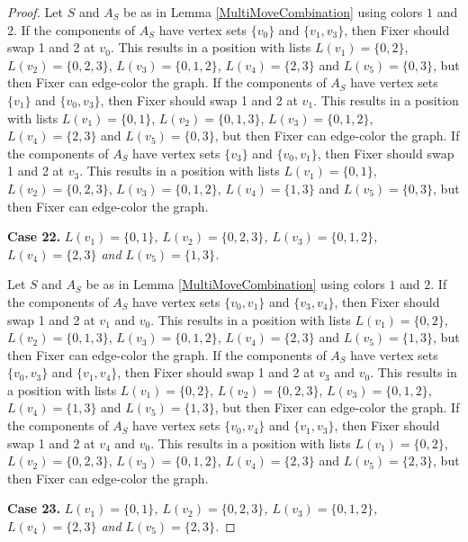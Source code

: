 \documentclass[12pt]{amsart}
\theoremstyle{plain}
\theoremstyle{definition}
\theoremstyle{remark}
\begin{document}
\begin{proof}
Let $S$ and $A_S$ be as in Lemma \ref{MultiMoveCombination} using colors $1$ and $2$. If the components of $A_S$ have vertex sets $\{v_0\}$ and $\{v_1, v_3\}$, then Fixer should swap 1 and 2 at $v_0$. This results in a position with lists $L(v_1) = \{0, 2\}$, $L(v_2) = \{0, 2, 3\}$, $L(v_3) = \{0, 1, 2\}$, $L(v_4) = \{2, 3\}$ and $L(v_5) = \{0, 3\}$, but then Fixer can edge-color the graph.
If the components of $A_S$ have vertex sets $\{v_1\}$ and $\{v_0, v_3\}$, then Fixer should swap 1 and 2 at $v_1$. This results in a position with lists $L(v_1) = \{0, 1\}$, $L(v_2) = \{0, 1, 3\}$, $L(v_3) = \{0, 1, 2\}$, $L(v_4) = \{2, 3\}$ and $L(v_5) = \{0, 3\}$, but then Fixer can edge-color the graph.
If the components of $A_S$ have vertex sets $\{v_3\}$ and $\{v_0, v_1\}$, then Fixer should swap 1 and 2 at $v_3$. This results in a position with lists $L(v_1) = \{0, 1\}$, $L(v_2) = \{0, 2, 3\}$, $L(v_3) = \{0, 1, 2\}$, $L(v_4) = \{1, 3\}$ and $L(v_5) = \{0, 3\}$, but then Fixer can edge-color the graph.

\noindent\textbf{Case 22.  }\textit{$L(v_1) = \{0, 1\}$, $L(v_2) = \{0, 2, 3\}$, $L(v_3) = \{0, 1, 2\}$, $L(v_4) = \{2, 3\}$ and $L(v_5) = \{1, 3\}$.}

Let $S$ and $A_S$ be as in Lemma \ref{MultiMoveCombination} using colors $1$ and $2$. If the components of $A_S$ have vertex sets $\{v_0, v_1\}$ and $\{v_3, v_4\}$, then Fixer should swap 1 and 2 at $v_1$ and $v_0$. This results in a position with lists $L(v_1) = \{0, 2\}$, $L(v_2) = \{0, 1, 3\}$, $L(v_3) = \{0, 1, 2\}$, $L(v_4) = \{2, 3\}$ and $L(v_5) = \{1, 3\}$, but then Fixer can edge-color the graph.
If the components of $A_S$ have vertex sets $\{v_0, v_3\}$ and $\{v_1, v_4\}$, then Fixer should swap 1 and 2 at $v_3$ and $v_0$. This results in a position with lists $L(v_1) = \{0, 2\}$, $L(v_2) = \{0, 2, 3\}$, $L(v_3) = \{0, 1, 2\}$, $L(v_4) = \{1, 3\}$ and $L(v_5) = \{1, 3\}$, but then Fixer can edge-color the graph.
If the components of $A_S$ have vertex sets $\{v_0, v_4\}$ and $\{v_1, v_3\}$, then Fixer should swap 1 and 2 at $v_4$ and $v_0$. This results in a position with lists $L(v_1) = \{0, 2\}$, $L(v_2) = \{0, 2, 3\}$, $L(v_3) = \{0, 1, 2\}$, $L(v_4) = \{2, 3\}$ and $L(v_5) = \{2, 3\}$, but then Fixer can edge-color the graph.

\noindent\textbf{Case 23.  }\textit{$L(v_1) = \{0, 1\}$, $L(v_2) = \{0, 2, 3\}$, $L(v_3) = \{0, 1, 2\}$, $L(v_4) = \{2, 3\}$ and $L(v_5) = \{2, 3\}$.}


\end{proof}
\end{document}
